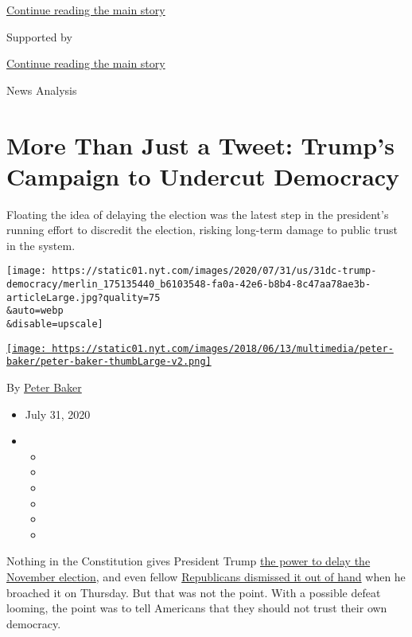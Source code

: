 \protect\hyperlink{after-top}{Continue reading the main story}

Supported by

\protect\hyperlink{after-sponsor}{Continue reading the main story}

News Analysis

\hypertarget{more-than-just-a-tweet-trumps-campaign-to-undercut-democracy}{%
\section{More Than Just a Tweet: Trump's Campaign to Undercut
Democracy}\label{more-than-just-a-tweet-trumps-campaign-to-undercut-democracy}}

Floating the idea of delaying the election was the latest step in the
president's running effort to discredit the election, risking long-term
damage to public trust in the system.

\texttt{[image: https://static01.nyt.com/images/2020/07/31/us/31dc-trump-democracy/merlin\_175135440\_b6103548-fa0a-42e6-b8b4-8c47aa78ae3b-articleLarge.jpg?quality=75\\\&auto=webp\\\&disable=upscale]}

\href{https://www.nytimes.com/by/peter-baker}{\texttt{[image: https://static01.nyt.com/images/2018/06/13/multimedia/peter-baker/peter-baker-thumbLarge-v2.png]}}

By \href{https://www.nytimes.com/by/peter-baker}{Peter Baker}

\begin{itemize}
\item
  July 31, 2020
\item
  \begin{itemize}
  \item
  \item
  \item
  \item
  \item
  \item
  \end{itemize}
\end{itemize}

Nothing in the Constitution gives President Trump
\href{https://www.nytimes.com/2020/07/30/us/politics/trump-postpone-election.html?action=click\&module=Top\%20Stories\&pgtype=Homepage}{the
power to delay the November election}, and even fellow
\href{https://www.nytimes.com/2020/07/30/us/politics/trump-delay-2020-election.html?action=click\&module=Top\%20Stories\&pgtype=Homepage}{Republicans
dismissed it out of hand} when he broached it on Thursday. But that was
not the point. With a possible defeat looming, the point was to tell
Americans that they should not trust their own democracy.

